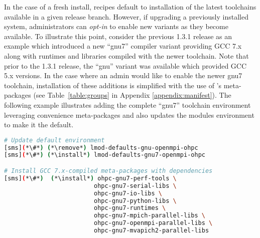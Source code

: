 In the case of a fresh install, \OHPC{} recipes default to installation of the
latest toolchains available in a given release branch. However, if upgrading a
previously installed system, administrators can {\em opt-in} to enable new
variants as they become available. To illustrate this point, consider the previous \OHPC{}
1.3.1 release as an example which introduced a new {``gnu7''} compiler variant
providing GCC 7.x along with runtimes and libraries compiled
with the newer toolchain. Note that prior to the 1.3.1 release, the {``gnu''} variant was
available which provided GCC 5.x versions.
In the case where an admin would like to enable the newer {gnu7} toolchain,
installation of these additions is simplified
with the use of \OHPC{}'s meta-packages (see Table~\ref{table:groups} in Appendix 
\ref{appendix:manifest}).
The following example illustrates adding the complete ``gnu7'' toolchain
environment leveraging convenience meta-packages and also updates the modules environment to make it the default.

\begin{lstlisting}[language=bash,keywords={}]
# Update default environment
[sms](*\#*) (*\remove*) lmod-defaults-gnu-openmpi-ohpc
[sms](*\#*) (*\install*) lmod-defaults-gnu7-openmpi-ohpc

# Install GCC 7.x-compiled meta-packages with dependencies
[sms](*\#*)  (*\install*) ohpc-gnu7-perf-tools \
                         ohpc-gnu7-serial-libs \
                         ohpc-gnu7-io-libs \
                         ohpc-gnu7-python-libs \
                         ohpc-gnu7-runtimes \
                         ohpc-gnu7-mpich-parallel-libs \
                         ohpc-gnu7-openmpi-parallel-libs \
                         ohpc-gnu7-mvapich2-parallel-libs
\end{lstlisting}

